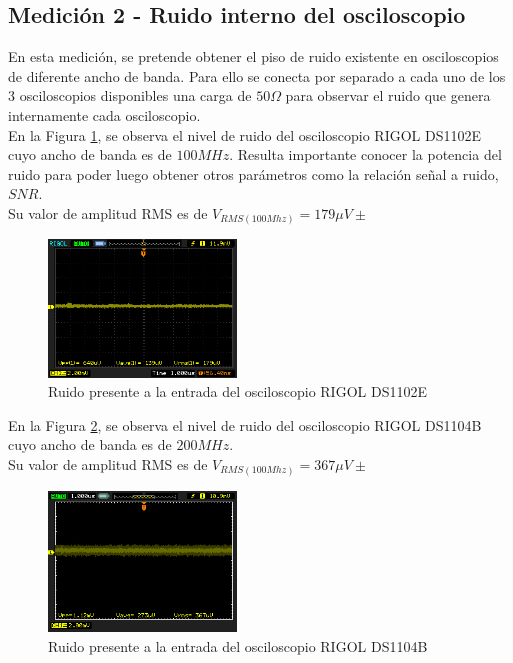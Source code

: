 \documentclass[a4paper,10pt]{article}
\begin{document}
	\subsection{Medición 2 - Ruido interno del osciloscopio}
	\indent En esta medici\'on, se pretende obtener el piso de ruido existente 
	en osciloscopios de diferente ancho de banda. Para ello se conecta por 
	separado a cada uno de los 3 osciloscopios disponibles una carga de 
	$50\Omega$ para observar el ruido que genera internamente cada osciloscopio.
	\\
	En la Figura \ref{img005}, se observa el nivel de ruido del osciloscopio 
	RIGOL DS1102E cuyo ancho de banda es de $100MHz$. Resulta importante conocer
	la potencia del ruido para poder luego obtener otros par\'ametros como la 
	relaci\'on se\~nal a ruido, $SNR$.\\
	\indent Su valor de amplitud RMS es de $V_{RMS(100Mhz)}=179\mu V \pm$
		\begin{figure}[!htb]
			\centering
			\includegraphics[width=5cm]
			{Imagenes/Ruido100Mhz.png}
			\caption{Ruido presente a la entrada del osciloscopio RIGOL DS1102E}
			\label{img005}
		\end{figure}
		
	\indent En la Figura \ref{img006}, se observa el nivel de ruido del 
	osciloscopio RIGOL DS1104B cuyo ancho de banda es de $200MHz$. \\
	\indent Su valor de amplitud RMS es de $V_{RMS(100Mhz)}=367\mu V \pm$		
		\begin{figure}[!htb]
			\centering
			\includegraphics[width=5cm]
			{Imagenes/Ruido200Mhz.png}
			\caption{Ruido presente a la entrada del osciloscopio RIGOL DS1104B}
			\label{img006}
		\end{figure}
		
\end{document}

